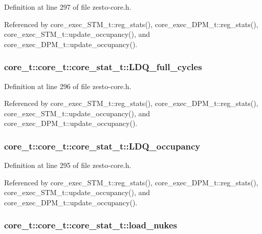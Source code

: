Definition at line 297 of file zesto-core.h.

Referenced by core\_\-exec\_\-STM\_\-t::reg\_\-stats(), core\_\-exec\_\-DPM\_\-t::reg\_\-stats(), core\_\-exec\_\-STM\_\-t::update\_\-occupancy(), and core\_\-exec\_\-DPM\_\-t::update\_\-occupancy().
\subsubsection[{LDQ\_\-full\_\-cycles}]{ core\_\-t::core\_\-t::core\_\-stat\_\-t::LDQ\_\-full\_\-cycles}\label{structcore__t_1_1core__stat__t_b0b5be3619f63b56564dcc8bd071498c}




Definition at line 296 of file zesto-core.h.

Referenced by core\_\-exec\_\-STM\_\-t::reg\_\-stats(), core\_\-exec\_\-DPM\_\-t::reg\_\-stats(), core\_\-exec\_\-STM\_\-t::update\_\-occupancy(), and core\_\-exec\_\-DPM\_\-t::update\_\-occupancy().
\subsubsection[{LDQ\_\-occupancy}]{ core\_\-t::core\_\-t::core\_\-stat\_\-t::LDQ\_\-occupancy}\label{structcore__t_1_1core__stat__t_e1d79fd0bb4a1ed80afb00241258a6a2}




Definition at line 295 of file zesto-core.h.

Referenced by core\_\-exec\_\-STM\_\-t::reg\_\-stats(), core\_\-exec\_\-DPM\_\-t::reg\_\-stats(), core\_\-exec\_\-STM\_\-t::update\_\-occupancy(), and core\_\-exec\_\-DPM\_\-t::update\_\-occupancy().
\subsubsection[{load\_\-nukes}]{ core\_\-t::core\_\-t::core\_\-stat\_\-t::load\_\-nukes}\label{structcore__t_1_1core__stat__t_39d7d4fa63d61b57d7b92c14827c0704}




